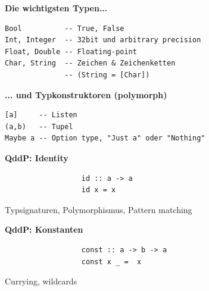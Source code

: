 \documentclass[unknownkeysallowed]{beamer}
\begin{document}
  \begin{frame}[fragile]

    \begin{center}
    \Large\textbf{Die wichtigsten Typen...}\\
    
\begin{verbatim}
Bool          -- True, False
Int, Integer  -- 32bit und arbitrary precision
Float, Double -- Floating-point 
Char, String  -- Zeichen & Zeichenketten
              -- (String = [Char])
\end{verbatim}

\pause
\Large\textbf{... und Typkonstruktoren (polymorph)}\\

\begin{verbatim}             
[a]     -- Listen     
(a,b)   -- Tupel      
Maybe a -- Option type, "Just a" oder "Nothing"
\end{verbatim}

    \end{center}
\end{frame}

  
  \begin{frame}[fragile]

    \begin{center}
    \Large\textbf{QddP: Identity}\\\bigskip

\begin{verbatim}
                  id :: a -> a
                  id x = x
\end{verbatim}

Typsignaturen, Polymorphismus, Pattern matching

    \end{center}
\end{frame}

  
  \begin{frame}[fragile]

    \begin{center}
    \Large\textbf{QddP: Konstanten}\\\bigskip

\begin{verbatim}
                  const :: a -> b -> a
                  const x _ =  x
\end{verbatim}

Currying, wildcards

    \end{center}
\end{frame}
\end{document}
